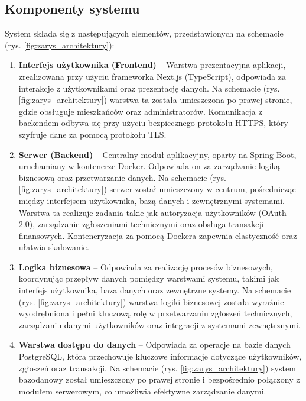 \subsection{Komponenty systemu}
System składa się z następujących elementów, przedstawionych na schemacie (rys. \ref{fig:zarys_architektury}):

\begin{enumerate}[label=\arabic*.]

	\item \textbf{Interfejs użytkownika (Frontend)} – Warstwa prezentacyjna aplikacji, zrealizowana przy użyciu frameworka Next.js (TypeScript), odpowiada za interakcje z użytkownikami oraz prezentację danych. Na schemacie (rys. \ref{fig:zarys_architektury}) warstwa ta została umieszczona po prawej stronie, gdzie obsługuje mieszkańców oraz administratorów. Komunikacja z backendem odbywa się przy użyciu bezpiecznego protokołu HTTPS, który szyfruje dane za pomocą protokołu TLS.

	\item \textbf{Serwer (Backend)} – Centralny moduł aplikacyjny, oparty na Spring Boot, uruchamiany w kontenerze Docker. Odpowiada on za zarządzanie logiką biznesową oraz przetwarzanie danych. Na schemacie (rys. \ref{fig:zarys_architektury}) serwer został umieszczony w centrum, pośrednicząc między interfejsem użytkownika, bazą danych i zewnętrznymi systemami. Warstwa ta realizuje zadania takie jak autoryzacja użytkowników (OAuth 2.0), zarządzanie zgłoszeniami technicznymi oraz obsługa transakcji finansowych. Konteneryzacja za pomocą Dockera zapewnia elastyczność oraz ułatwia skalowanie.

	\item \textbf{Logika biznesowa} – Odpowiada za realizację procesów biznesowych, koordynując przepływ danych pomiędzy warstwami systemu, takimi jak interfejs użytkownika, baza danych oraz zewnętrzne systemy. Na schemacie (rys. \ref{fig:zarys_architektury}) warstwa logiki biznesowej została wyraźnie wyodrębniona i pełni kluczową rolę w przetwarzaniu zgłoszeń technicznych, zarządzaniu danymi użytkowników oraz integracji z systemami zewnętrznymi.

	\item \textbf{Warstwa dostępu do danych} – Odpowiada za operacje na bazie danych PostgreSQL, która przechowuje kluczowe informacje dotyczące użytkowników, zgłoszeń oraz transakcji. Na schemacie (rys. \ref{fig:zarys_architektury}) system bazodanowy został umieszczony po prawej stronie i bezpośrednio połączony z modułem serwerowym, co umożliwia efektywne zarządzanie danymi.


\end{enumerate}
